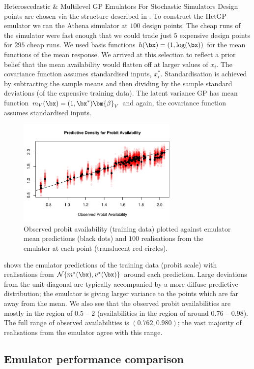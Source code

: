 \begin{chapter}{Heteroscedastic \& Multilevel GP Emulators For Stochastic Simulators\label{Ch:Hetsml}}
Design points are chosen via the structure described in . To construct the HetGP emulator we ran the Athena simulator at $100$ design points. The cheap runs of the simulator were fast enough that we could trade just $5$ expensive design points for $295$ cheap runs. We used basis functions $h(\bx) = (1, \log(\bx))$ for the mean functions of the mean response. We arrived at this selection to reflect a prior belief that the mean availability would flatten off at larger values of $x_i$. The covariance function assumes standardised inputs, $x_i^*$. Standardisation is achieved by subtracting the sample means and then dividing by the sample standard deviations (of the expensive training data). The latent variance GP has mean function $m_V(\bx) = (1, \bx^*)\bm{\beta}_V$ and again, the covariance function assumes standardised inputs.
\begin{figure}
	\centering
	\includegraphics[width=0.7\textwidth]{sml-het-fig2/obs-pred-new.pdf}
\caption{Observed probit availability (training data) plotted against emulator mean predictions (black dots) and $100$ realisations from the emulator at each point (translucent red circles).\label{Fig:within-sample}}
\end{figure}
 shows the emulator predictions of the training data (probit scale) with realisations from $\mathcal{N}\{m^{*}(\bx), v^{*}(\bx)\}$ around each prediction. Large deviations from the unit diagonal are typically accompanied by a more diffuse predictive distribution; the emulator is giving larger variance to the points which are far away from the mean. We also see that the observed probit availabilities are mostly in the region of $0.5$ -- $2$ (availabilities in the region of around $0.76$ -- $0.98$). The full range of observed availabilities is $(0.762, 0.980)$; the vast majority of realisations from the emulator agree with this range.

\subsection{Emulator performance comparison}


\end{chapter}
